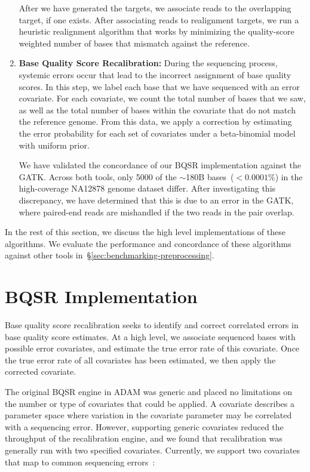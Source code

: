 \documentclass[phd]{ucbthesis}
\begin{document}
\begin{enumerate}
After we have generated the targets, we associate reads to the overlapping target, if one exists. After
associating reads to realignment targets, we run a heuristic realignment algorithm that works by minimizing
the quality-score weighted number of bases that mismatch against the reference.
\item \textbf{Base Quality Score Recalibration:} During the sequencing process, systemic errors occur
that lead to the incorrect assignment of base quality scores. In this step, we label each base that we have
sequenced with an error covariate. For each covariate, we count the total number of bases that we saw,
as well as the total number of bases within the covariate that do not match the reference genome. From this data, 
we apply a correction by estimating the error probability for each set of covariates under a beta-binomial model
with uniform prior.

We have validated the concordance of our BQSR implementation against the GATK. Across both tools, only 5000
of the $\sim$180B bases~($<0.0001\%$) in the high-coverage NA12878 genome dataset differ. After investigating
this discrepancy, we have determined that this is due to an error in the GATK, where paired-end reads are
mishandled if the two reads in the pair overlap.
\end{enumerate}

In the rest of this section, we discuss the high level implementations of these algorithms.
We evaluate the performance and concordance of these algorithms against other
tools in~\S\ref{sec:benchmarking-preprocessing}.

\section{BQSR Implementation}
\label{sec:bqsr-implementation}

Base quality score recalibration seeks to identify and correct correlated errors in base quality score estimates.
At a high level, we associate sequenced bases with possible error covariates, and estimate the
true error rate of this covariate. Once the true error rate of all covariates has been estimated, we then apply
the corrected covariate.

The original BQSR engine in {ADAM} was generic and placed
no limitations on the number or type of covariates that could be applied. A
covariate describes a parameter space where variation in the covariate parameter
may be correlated with a sequencing error. However, supporting generic covariates
reduced the throughput of the recalibration engine, and we found that
recalibration was generally run with two specified covariates. Currently, we
support two covariates that map to common sequencing errors~\cite{nakamura11}:
\end{document}
